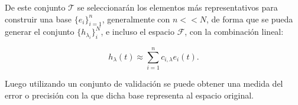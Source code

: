 De este conjunto $\mathcal{T}$ se seleccionarán los elementos más representativos para construir una base $\{e_i\}_{i=1}^n$, generalmente con $n << N$, de forma que se pueda generar el conjunto $\{h_{\lambda_i}\}_i^N$, e incluso el espacio $\mathcal{F}$, con la combinación lineal:


\begin{equation}
\label{eq:rb0}
h_{\lambda} (t) \approx \sum_{i=1}^{n} c_{i,\lambda} e_i(t).
\end{equation}

Luego utilizando un conjunto de validación se puede obtener una medida del error o precisión con la que dicha base representa al espacio original.



